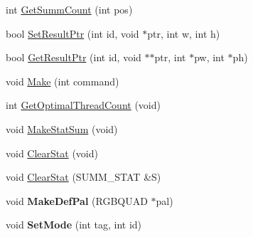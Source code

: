 \begin{DoxyCompactItemize}
int \hyperlink{class_c_v_i_engine_base_a354f23eda839e4aff3b578fc5ad50363}{Get\+Summ\+Count} (int pos)
\item 
bool \hyperlink{class_c_v_i_engine_base_a38d38d266d48fad44435eec46a1086a6}{Set\+Result\+Ptr} (int id, void $\ast$ptr, int w, int h)
\item 
bool \hyperlink{class_c_v_i_engine_base_a99f7df701bfe9d53121e5cd00167e591}{Get\+Result\+Ptr} (int id, void $\ast$$\ast$ptr, int $\ast$pw, int $\ast$ph)
\item 
void \hyperlink{class_c_v_i_engine_base_aa59b55fc315394f4c19cb7d95c399913}{Make} (int command)
\item 
int \hyperlink{class_c_v_i_engine_base_a1e0174d46d3d28931a648e0437f0686d}{Get\+Optimal\+Thread\+Count} (void)
\item 
void \hyperlink{class_c_v_i_engine_base_a2b86bf7f377f62e7a701fb3466708d04}{Make\+Stat\+Sum} (void)
\item 
void \hyperlink{class_c_v_i_engine_base_a10d6138a2c8f4c4c946bf930c268be6b}{Clear\+Stat} (void)
\item 
void \hyperlink{class_c_v_i_engine_base_adb910c0d7f06cf1f3ea7b2347aed1751}{Clear\+Stat} (S\+U\+M\+M\+\_\+\+S\+T\+A\+T \&S)
\item 
\hypertarget{class_c_v_i_engine_base_a96dd47cc32f324e133644e7f823507ad}{void {\bfseries Make\+Def\+Pal} (R\+G\+B\+Q\+U\+A\+D $\ast$pal)}\label{class_c_v_i_engine_base_a96dd47cc32f324e133644e7f823507ad}

\item 
\hypertarget{class_c_v_i_engine_base_a22ba2d068df7651b957bb7cb00a324be}{void {\bfseries Set\+Mode} (int tag, int id)}\label{class_c_v_i_engine_base_a22ba2d068df7651b957bb7cb00a324be}


\end{DoxyCompactItemize}
